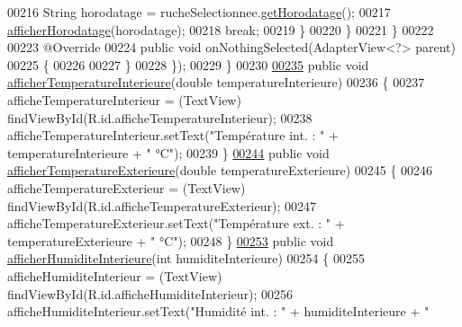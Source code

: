\begin{DoxyCode}
00216                         String horodatage = rucheSelectionnee.\hyperlink{classcom_1_1example_1_1bee__honeyt_1_1_ruche_a864e48de51e9b0e8e5c78ed7fe58a2d9}{getHorodatage}();
00217                         \hyperlink{classcom_1_1example_1_1bee__honeyt_1_1_i_h_m_mobile_ae1a488c4774eea0b794257f576ab932d}{afficherHorodatage}(horodatage);
00218                         \textcolor{keywordflow}{break};
00219                     \}
00220                 \}
00221             \}
00222 
00223             @Override
00224             \textcolor{keyword}{public} \textcolor{keywordtype}{void} onNothingSelected(AdapterView<?> parent)
00225             \{
00226 
00227             \}
00228         \});
00229     \}
00230 
\hyperlink{classcom_1_1example_1_1bee__honeyt_1_1_i_h_m_mobile_ac0f55897a183a0887c87954f6fbfdf2f}{00235}     \textcolor{keyword}{public} \textcolor{keywordtype}{void} \hyperlink{classcom_1_1example_1_1bee__honeyt_1_1_i_h_m_mobile_ac0f55897a183a0887c87954f6fbfdf2f}{afficherTemperatureInterieure}(\textcolor{keywordtype}{double} temperatureInterieure)
00236     \{
00237         afficheTemperatureInterieur = (TextView) findViewById(R.id.afficheTemperatureInterieur);
00238         afficheTemperatureInterieur.setText(\textcolor{stringliteral}{"Température int. : "} + temperatureInterieure + \textcolor{stringliteral}{" °C"});
00239     \}
\hyperlink{classcom_1_1example_1_1bee__honeyt_1_1_i_h_m_mobile_af7ce50e9cc663c2c9198bbbb2b7882ff}{00244}     \textcolor{keyword}{public} \textcolor{keywordtype}{void} \hyperlink{classcom_1_1example_1_1bee__honeyt_1_1_i_h_m_mobile_af7ce50e9cc663c2c9198bbbb2b7882ff}{afficherTemperatureExterieure}(\textcolor{keywordtype}{double} temperatureExterieure)
00245     \{
00246         afficheTemperatureExterieur = (TextView) findViewById(R.id.afficheTemperatureExterieur);
00247         afficheTemperatureExterieur.setText(\textcolor{stringliteral}{"Température ext. : "} + temperatureExterieure + \textcolor{stringliteral}{" °C"});
00248     \}
\hyperlink{classcom_1_1example_1_1bee__honeyt_1_1_i_h_m_mobile_ae59dbfdcd0be7d98bb714398931028b5}{00253}     \textcolor{keyword}{public} \textcolor{keywordtype}{void} \hyperlink{classcom_1_1example_1_1bee__honeyt_1_1_i_h_m_mobile_ae59dbfdcd0be7d98bb714398931028b5}{afficherHumiditeInterieure}(\textcolor{keywordtype}{int} humiditeInterieure)
00254     \{
00255         afficheHumiditeInterieur = (TextView) findViewById(R.id.afficheHumiditeInterieur);
00256         afficheHumiditeInterieur.setText(\textcolor{stringliteral}{"Humidité int. : "} + humiditeInterieure + \textcolor{stringliteral}{" %
}
\end{DoxyCode}

